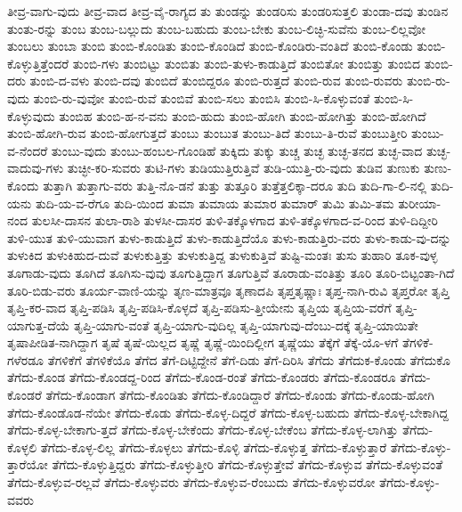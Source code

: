 {ತೀವ್ರ-ವಾಗು-ವುದು
ತೀವ್ರ-ವಾದ
ತೀವ್ರ-ವೈ-ರಾಗ್ಯದ
ತು
ತುಂಡನ್ನು
ತುಂಡರಿಸು
ತುಂಡರಿಸುತ್ತಲಿ
ತುಂಡಾ-ದವು
ತುಂಡಿನ
ತುಂತು-ರನ್ನು
ತುಂಬ
ತುಂಬ-ಬಲ್ಲುದು
ತುಂಬ-ಬಹುದು
ತುಂಬ-ಬೇಕು
ತುಂಬ-ಲಿಚ್ಛಿ-ಸುವೆನು
ತುಂಬ-ಲಿಲ್ಲವೋ
ತುಂಬಲು
ತುಂಬಾ
ತುಂಬಿ
ತುಂಬಿ-ಕೊಂಡಿತು
ತುಂಬಿ-ಕೊಂಡಿದೆ
ತುಂಬಿ-ಕೊಂಡಿರು-ವಂತಿದೆ
ತುಂಬಿ-ಕೊಂಡು
ತುಂಬಿ-ಕೊಳ್ಳುತ್ತಿತ್ತೆಂದರೆ
ತುಂಬಿ-ಗಳು
ತುಂಬಿಟ್ಟು
ತುಂಬಿತು
ತುಂಬಿ-ತುಳು-ಕಾಡುತ್ತಿದೆ
ತುಂಬಿತೋ
ತುಂಬಿತ್ತು
ತುಂಬಿದ
ತುಂಬಿ-ದರು
ತುಂಬಿ-ದ-ವಳು
ತುಂಬಿ-ದವು
ತುಂಬಿದೆ
ತುಂಬಿದ್ದರೂ
ತುಂಬಿ-ರುತ್ತದೆ
ತುಂಬಿ-ರುವ
ತುಂಬಿ-ರುವರು
ತುಂಬಿ-ರು-ವುದು
ತುಂಬಿ-ರು-ವುವೋ
ತುಂಬಿ-ರುವೆ
ತುಂಬಿವೆ
ತುಂಬಿ-ಸಲು
ತುಂಬಿಸಿ
ತುಂಬಿ-ಸಿ-ಕೊಳ್ಳುವಂತೆ
ತುಂಬಿ-ಸಿ-ಕೊಳ್ಳುವುದು
ತುಂಬಿಹ
ತುಂಬಿ-ಹ-ನ-ವನು
ತುಂಬಿ-ಹುದು
ತುಂಬಿ-ಹೋಗಿ
ತುಂಬಿ-ಹೋಗಿತ್ತು
ತುಂಬಿ-ಹೋಗಿದೆ
ತುಂಬಿ-ಹೋಗಿ-ರುವ
ತುಂಬಿ-ಹೋಗುತ್ತದೆ
ತುಂಬು
ತುಂಬುತ
ತುಂಬು-ತಿದೆ
ತುಂಬು-ತಿ-ರುವೆ
ತುಂಬುತ್ತೀರಿ
ತುಂಬು-ವ-ನೆಂದರೆ
ತುಂಬು-ವುದು
ತುಂಬು-ಹಂಬಲ-ಗೊಂಡಿಹೆ
ತುಕ್ಕಿದು
ತುಕ್ಕು
ತುಚ್ಚ
ತುಚ್ಛ
ತುಚ್ಛ-ತನದ
ತುಚ್ಛ-ವಾದ
ತುಚ್ಛ-ವಾದುವು-ಗಳು
ತುಚ್ಛೀ-ಕರಿ-ಸುವರು
ತುಟಿ-ಗಳು
ತುಡಿಯುತ್ತಿರುತ್ತಿವೆ
ತುಡಿ-ಯುತ್ತಿ-ರು-ವುದು
ತುಡಿವ
ತುಣುಕು
ತುಣು-ಕೊಂದು
ತುತ್ತಾಗಿ
ತುತ್ತಾಗು-ವರು
ತುತ್ತಿ-ನೊ-ಡನೆ
ತುತ್ತು
ತುತ್ತೂರಿ
ತುತ್ತೆತ್ತಲಿಕ್ಕಾ-ದರೂ
ತುದಿ
ತುದಿ-ಗಾ-ಲಿ-ನಲ್ಲಿ
ತುದಿ-ಯನು
ತುದಿ-ಯ-ವ-ರೆಗೂ
ತುದಿ-ಯಿಂದ
ತುಮಾ
ತುಮಾಯ
ತುಮಾರ
ತುಮಾರ್
ತುಮಿ
ತುಮಿ-ತಮ
ತುರೀಯಾ-ನಂದ
ತುಲಸೀ-ದಾಸನ
ತುಲಾ-ರಾಶಿ
ತುಳಸೀ-ದಾಸರ
ತುಳಿ-ತಕ್ಕೊಳಗಾದ
ತುಳಿ-ತಕ್ಕೊಳಗಾದ-ವ-ರಿಂದ
ತುಳಿ-ದಿದ್ದೀರಿ
ತುಳಿ-ಯುತ
ತುಳಿ-ಯುವಾಗ
ತುಳು-ಕಾಡುತ್ತಿದೆ
ತುಳು-ಕಾಡುತ್ತಿದೆಯೊ
ತುಳು-ಕಾಡುತ್ತಿರು-ವರು
ತುಳು-ಕಾಡು-ವು-ದನ್ನು
ತುಳುಕಿದ
ತುಳುಕಿಹುದ-ದುವೆ
ತುಳುಕುತ್ತಿತ್ತು
ತುಳುಕುತ್ತಿದ್ದ
ತುಳುಕುತ್ತಿವೆ
ತುಷ್ಟಿ-ಮಂತಃ
ತುಸು
ತುಹಾರಿ
ತೂಕ-ವುಳ್ಳ
ತೂಗಾಡು-ವುದು
ತೂಗಿದೆ
ತೂಗಿಸು-ವುವು
ತೂಗುತ್ತಿದ್ದಾಗ
ತೂಗುತ್ತಿವೆ
ತೂರಾಡು-ವಂತಿತ್ತು
ತೂರಿ
ತೂರಿ-ಬಿಟ್ಟಂತಾ-ಗಿದೆ
ತೂರಿ-ಬಿಡು-ವರು
ತೂರ್ಯ-ವಾಣಿ-ಯನ್ನು
ತೃಣ-ಮಾತ್ರವೂ
ತೃಣಾದಪಿ
ತೃಪ್ತತೃಷ್ಣಾಃ
ತೃಪ್ತ-ನಾಗಿ-ರುವಿ
ತೃಪ್ತರೋ
ತೃಪ್ತಿ
ತೃಪ್ತಿ-ಕರ-ವಾದ
ತೃಪ್ತಿ-ಪಡಿಸಿ
ತೃಪ್ತಿ-ಪಡಿಸಿ-ಕೊಳ್ಳದೆ
ತೃಪ್ತಿ-ಪಡಿಸು-ತ್ತೀಯೇನು
ತೃಪ್ತಿಯ
ತೃಪ್ತಿಯ-ವರೆಗೆ
ತೃಪ್ತಿ-ಯಾಗುತ್ತ-ದೆಯೆ
ತೃಪ್ತಿ-ಯಾಗು-ವಂತೆ
ತೃಪ್ತಿ-ಯಾಗು-ವುದಿಲ್ಲ
ತೃಪ್ತಿ-ಯಾಗುವು-ದೆಂಬು-ದಕ್ಕೆ
ತೃಪ್ತಿ-ಯಾಯಿತೇ
ತೃಷಾಪೀಡಿತ-ನಾಗಿದ್ದಾಗ
ತೃಷೆ
ತೃಷೆ-ಯಿಲ್ಲದ
ತೃಷ್ಣೆ
ತೃಷ್ಣೆ-ಯಿಂದಿಲ್ಲೀಗ
ತೃಷ್ಣೆಯು
ತೆಕ್ಕೆಗೆ
ತೆಕ್ಕೆ-ಯೊ-ಳಗೆ
ತೆಗಳಿಕೆ-ಗಳೆರಡೂ
ತೆಗಳಿಕೆಗೆ
ತೆಗಳಿಕೆಯೊ
ತೆಗೆದ
ತೆಗೆ-ದಿಟ್ಟಿದ್ದೇನೆ
ತೆಗೆ-ದಿಡು
ತೆಗೆ-ದಿರಿಸಿ
ತೆಗೆದು
ತೆಗೆದುಕ-ಕೊಂಡು
ತೆಗೆದುಕೊ
ತೆಗೆದು-ಕೊಂಡ
ತೆಗೆದು-ಕೊಂಡದ್ದ-ರಿಂದ
ತೆಗೆದು-ಕೊಂಡ-ರಂತೆ
ತೆಗೆದು-ಕೊಂಡರು
ತೆಗೆದು-ಕೊಂಡರೂ
ತೆಗೆದು-ಕೊಂಡರೆ
ತೆಗೆದು-ಕೊಂಡಾಗ
ತೆಗೆದು-ಕೊಂಡಿತು
ತೆಗೆದು-ಕೊಂಡಿದ್ದಾರೆ
ತೆಗೆದು-ಕೊಂಡು
ತೆಗೆದು-ಕೊಂಡು-ಹೋಗಿ
ತೆಗೆದು-ಕೊಂಡೊಡ-ನೆಯೇ
ತೆಗೆದು-ಕೊಡು
ತೆಗೆದು-ಕೊಳ್ಳ-ದಿದ್ದರೆ
ತೆಗೆದು-ಕೊಳ್ಳ-ಬಹುದು
ತೆಗೆದು-ಕೊಳ್ಳ-ಬೇಕಾಗಿದ್ದ
ತೆಗೆದು-ಕೊಳ್ಳ-ಬೇಕಾಗು-ತ್ತದೆ
ತೆಗೆದು-ಕೊಳ್ಳ-ಬೇಕೆಂದು
ತೆಗೆದು-ಕೊಳ್ಳ-ಬೇಕೆಂಬ
ತೆಗೆದು-ಕೊಳ್ಳ-ಲಾಗಿತ್ತು
ತೆಗೆದು-ಕೊಳ್ಳಲಿ
ತೆಗೆದು-ಕೊಳ್ಳ-ಲಿಲ್ಲ
ತೆಗೆದು-ಕೊಳ್ಳಲು
ತೆಗೆದು-ಕೊಳ್ಳಿ
ತೆಗೆದು-ಕೊಳ್ಳುತ್ತ
ತೆಗೆದು-ಕೊಳ್ಳುತ್ತಾರೆ
ತೆಗೆದು-ಕೊಳ್ಳು-ತ್ತಾರೆಯೋ
ತೆಗೆದು-ಕೊಳ್ಳುತ್ತಿದ್ದರು
ತೆಗೆದು-ಕೊಳ್ಳುತ್ತೀರಿ
ತೆಗೆದು-ಕೊಳ್ಳುತ್ತೇವೆ
ತೆಗೆದು-ಕೊಳ್ಳುವ
ತೆಗೆದು-ಕೊಳ್ಳುವಂತೆ
ತೆಗೆದು-ಕೊಳ್ಳುವ-ರಲ್ಲವೆ
ತೆಗೆದು-ಕೊಳ್ಳುವರು
ತೆಗೆದು-ಕೊಳ್ಳುವ-ರೆಂಬುದು
ತೆಗೆದು-ಕೊಳ್ಳುವರೋ
ತೆಗೆದು-ಕೊಳ್ಳು-ವವರು
}
